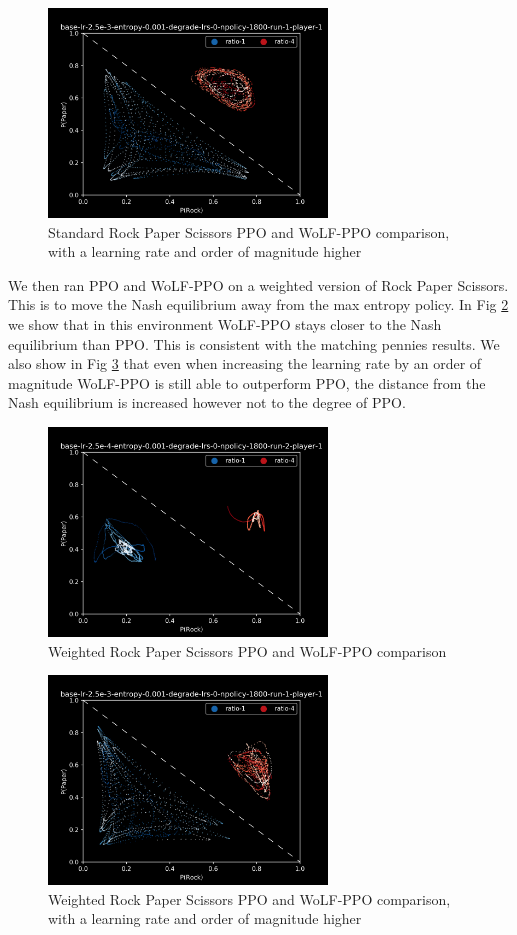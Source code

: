\documentclass{article}
\begin{document}
\begin{figure}
    \centering
    \includegraphics[width=20em]{Figures/rps-ppo-e3.png}
    \caption{Standard Rock Paper Scissors PPO and WoLF-PPO comparison, with a learning rate and order of magnitude higher}
    \label{fig:rps-ppo-e3}
\end{figure}

We then ran PPO and WoLF-PPO on a weighted version of Rock Paper Scissors. This is to move the Nash equilibrium away from the max entropy policy. In Fig \ref{fig:weighted-rps-ppo-e4} we show that in this environment WoLF-PPO stays closer to the Nash equilibrium than PPO. This is consistent with the matching pennies results. We also show in Fig \ref{fig:weighted-rps-ppo-e3} that even when increasing the learning rate by an order of magnitude WoLF-PPO is still able to outperform PPO, the distance from the Nash equilibrium is increased however not to the degree of PPO.

\begin{figure}
    \centering
    \includegraphics[width=20em]{Figures/weighted-rps-ppo-e4.png}
    \caption{Weighted Rock Paper Scissors PPO and WoLF-PPO comparison}
    \label{fig:weighted-rps-ppo-e4}
\end{figure}

\begin{figure}
    \centering
    \includegraphics[width=20em]{Figures/weighted-rps-ppo-e3.png}
    \caption{Weighted Rock Paper Scissors PPO and WoLF-PPO comparison, with a learning rate and order of magnitude higher}
    \label{fig:weighted-rps-ppo-e3}
\end{figure}
\end{document}
